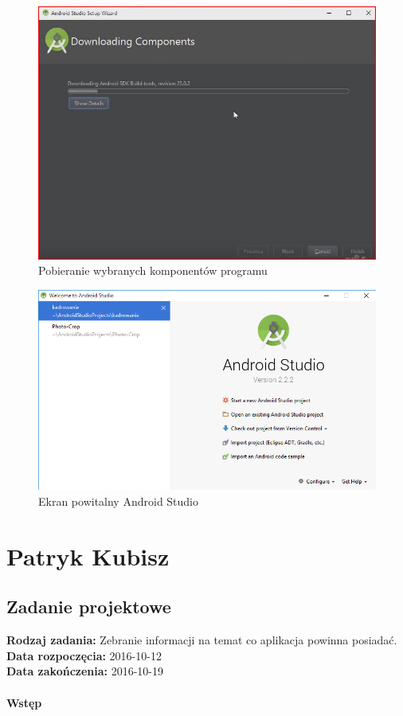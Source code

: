 \begin{figure}[h!]
\centering
\includegraphics[width=0.5\linewidth]{fig/i5}
\caption{Pobieranie wybranych komponentów programu}
\label{fig:15}
\end{figure}

\begin{figure}[h!]
\centering
\includegraphics[width=0.7\linewidth]{fig/i6}
\caption{Ekran powitalny Android Studio}
\label{fig:16}
\end{figure}




\chapter {Patryk Kubisz}
\section{Zadanie projektowe}

\noindent\textbf{Rodzaj zadania:} Zebranie informacji na temat co aplikacja powinna posiadać.\\

\noindent\textbf{Data rozpoczęcia:} 2016-10-12\\

\noindent\textbf{Data zakończenia:} 2016-10-19\\\\

\noindent\textbf{Wstęp}\\

